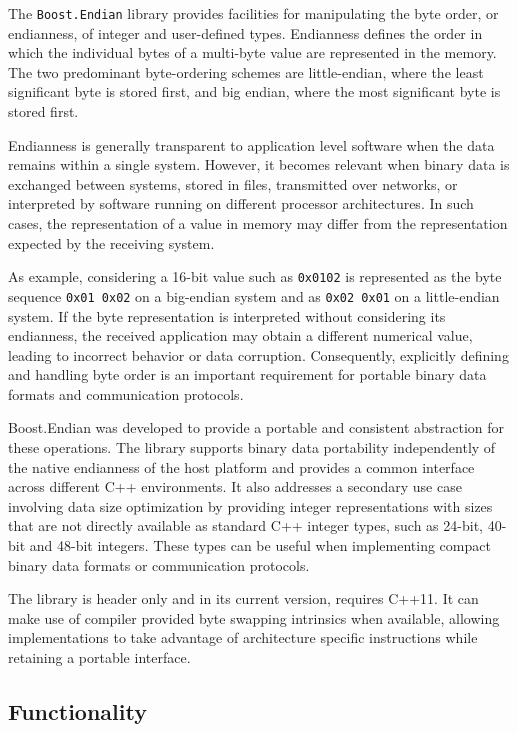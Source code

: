 The \texttt{Boost.Endian} library provides facilities for manipulating the byte order, or endianness, of integer and 
user-defined types. Endianness defines the order in which the individual bytes of a multi-byte value are represented in
the memory. The two predominant byte-ordering schemes are little-endian, where the least significant byte is stored 
first, and big endian, where the most significant byte is stored first.

Endianness is generally transparent to application level software when the data remains within a single system.
However, it becomes relevant when binary data is exchanged between systems, stored in files, transmitted over networks,
or interpreted by software running on different processor architectures. In such cases, the representation of a value
in memory may differ from the representation expected by the receiving system.

As example, considering a 16-bit value such as \texttt{0x0102} is represented as the byte sequence \texttt{0x01 0x02} 
on a big-endian system and as \texttt{0x02 0x01} on a little-endian system. If the byte representation 
is interpreted without considering its endianness, the received application may obtain a different numerical value, 
leading to incorrect behavior or data corruption. Consequently, explicitly defining and handling byte order 
is an important requirement for portable binary data formats and communication protocols.

Boost.Endian was developed to provide a portable and consistent abstraction for these operations. The library supports 
binary data portability independently of the native endianness of the host platform and provides a common interface
across different C++ environments. It also addresses a secondary use case involving data size optimization by 
providing integer representations with sizes that are not directly available as standard C++ integer types, 
such as 24-bit, 40-bit and 48-bit integers. These types can be useful when implementing compact binary data formats or communication protocols.

The library is header only and in its current version, requires C++11. It can make use of compiler provided byte swapping intrinsics 
when available, allowing implementations to take advantage of architecture specific instructions while retaining a portable interface.

\subsection{Functionality}

